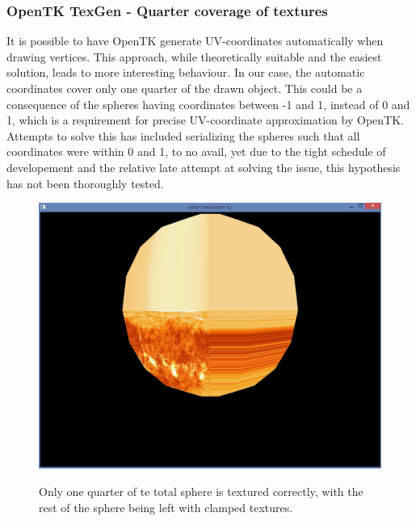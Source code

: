 \subsubsection{OpenTK TexGen - Quarter coverage of textures}
It is possible to have OpenTK generate UV-coordinates automatically when drawing vertices. This approach, while theoretically suitable and the easiest solution, leads to more interesting behaviour. In our case, the automatic coordinates cover only one quarter of the drawn object. This could be a consequence of the spheres having coordinates between -1 and 1, instead of 0 and 1, which is a requirement for precise UV-coordinate approximation by OpenTK.\\
Attempts to solve this has included serializing the spheres such that all coordinates were within 0 and 1, to no avail, yet due to the tight schedule of developement and the relative late attempt at solving the issue, this hypothesis has not been thoroughly tested.
\begin{figure}
	\centering
	\includegraphics[scale=0.3]{Pictures/Bugs/TexGenQuarterCoverage}
	\label{TexGenError}
	\caption{Only one quarter of te total sphere is textured correctly, with the rest of the sphere being left with clamped textures.}
\end{figure}

